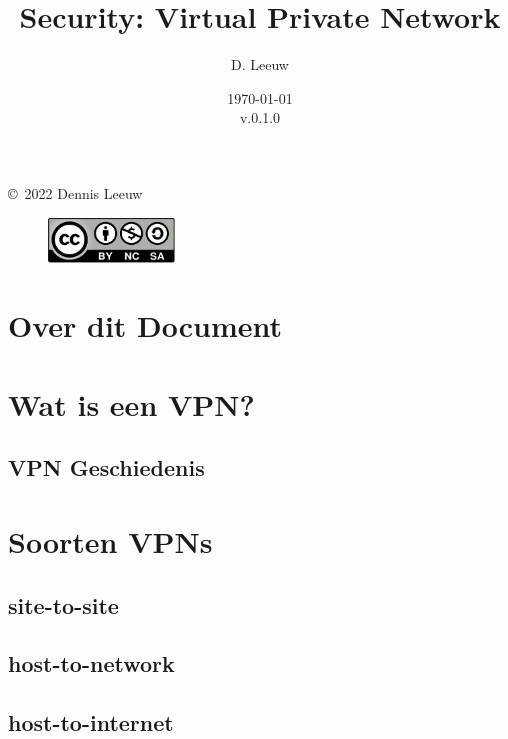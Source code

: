 \documentclass[a4paper,12pt,twoside,openright,titlepage]{book}
\author{D. Leeuw}
\title{Security: Virtual Private Network}
\date{\today\\v.0.1.0}
\begin{document}

\maketitle

\copyright\ 2022 Dennis Leeuw\\

\begin{figure}[H]
\includegraphics[width=0.3\textwidth]{CC-BY-SA-NC.png}
\end{figure}

\bigskip




\frontmatter
\chapter{Over dit Document}



\tableofcontents

\mainmatter

\chapter{Wat is een VPN?}

\section{VPN Geschiedenis}


\chapter{Soorten VPNs}

\section{site-to-site}
\section{host-to-network}
\section{host-to-internet}
\end{document}
